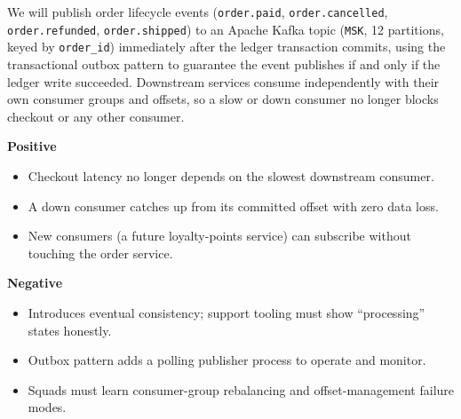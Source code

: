 \documentclass[10pt]{article}
\begin{document}
\begin{decbox}
We will publish order lifecycle events (\texttt{order.paid}, \texttt{order.cancelled}, \texttt{order.refunded}, \texttt{order.shipped}) to an Apache Kafka topic (\texttt{MSK}, 12 partitions, keyed by \texttt{order\_id}) immediately after the ledger transaction commits, using the transactional outbox pattern to guarantee the event publishes if and only if the ledger write succeeded. Downstream services consume independently with their own consumer groups and offsets, so a slow or down consumer no longer blocks checkout or any other consumer.
\end{decbox}

\begin{consbox}
\noindent
\begin{minipage}[t]{0.48\linewidth}
\textbf{\textcolor{adrgreen}{Positive}}
\begin{itemize}
\item[\textcolor{adrgreen}{\faCheckCircle}] Checkout latency no longer depends on the slowest downstream consumer.
\item[\textcolor{adrgreen}{\faCheckCircle}] A down consumer catches up from its committed offset with zero data loss.
\item[\textcolor{adrgreen}{\faCheckCircle}] New consumers (a future loyalty-points service) can subscribe without touching the order service.
\end{itemize}
\end{minipage}\hfill
\begin{minipage}[t]{0.48\linewidth}
\textbf{\textcolor{adrred}{Negative}}
\begin{itemize}
\item[\textcolor{adrred}{\faTimesCircle}] Introduces eventual consistency; support tooling must show ``processing'' states honestly.
\item[\textcolor{adrred}{\faTimesCircle}] Outbox pattern adds a polling publisher process to operate and monitor.
\item[\textcolor{adrred}{\faTimesCircle}] Squads must learn consumer-group rebalancing and offset-management failure modes.
\end{itemize}
\end{minipage}
\end{consbox}
\end{document}

